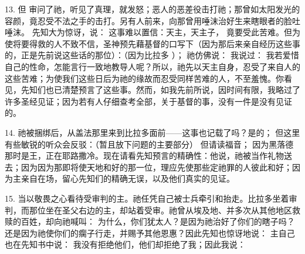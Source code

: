 13. 但  审问了祂，听见了真理，就发怒；恶人的恶差役击打祂；那曾如太阳发光的容颜，竟忍受不法之手的击打。另有人前来，向那曾用唾沫治好生来瞎眼者的脸吐唾沫。 先知大为惊讶，说： 这事难以置信：天主，天主子， 竟要受此苦难。但为使将要得救的人不致不信，圣神预先藉基督的口写下（因为那后来亲自经历这些事的，正是先前说这些话的那位）：（因为比拉多 ）； 祂仿佛说： 我说过： 我若爱惜自己的性命，怎能言行一致地教导人呢？所以，祂先以天主自身，忍受了来自人的这些苦难；为使我们这些日后为祂的缘故而忍受同样苦难的人，不至羞愧。你看见，先知们也已清楚预言了这些事。然而，如我先前所说，因时间有限，我略过了许多圣经见证；因为若有人仔细查考全部，关于基督的事，没有一件是没有见证的。\par

14. 祂被捆绑后，从盖法那里来到比拉多面前——这事也记载了吗？是的； 但这里有些敏锐的听众会反驳：（暂且放下问题的主要部分） 但请读福音； 因为黑落德那时是王，正在耶路撒冷。现在请看先知预言的精确性：他说，祂被当作礼物送去；因为因为那即将使天地和好的那一位，理应先使那些定祂罪的人彼此和好；因为主亲自在场，留心先知们的精确无误，以及他们真实的见证。\par

15. 当以敬畏之心看待受审判的主。祂任凭自己被士兵牵引和抬走。比拉多坐着审判，而那位坐在圣父右边的主，却站着受审。祂曾从埃及地、并多次从其他地区救赎的百姓，却向祂喊叫： 为什么，你们犹太人？是因为祂治好了你们的瞎子吗？还是因为祂使你们的瘸子行走，并赐予其他恩惠？因此先知也惊讶地说： 主自己也在先知书中说： 我没有拒绝他们，他们却拒绝了我；因此我说：\par

